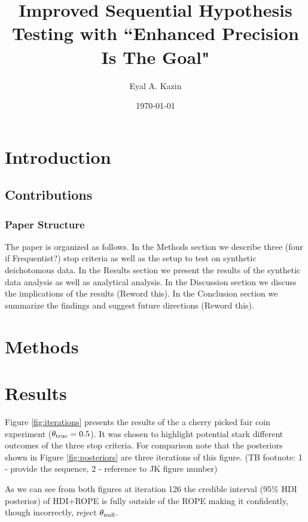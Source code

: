 \documentclass{article}
\title{Improved Sequential Hypothesis Testing with
``Enhanced Precision Is The Goal"}
\date{\today}
\author{Eyal A. Kazin}
\begin{document}
\maketitle



\section{Introduction}


\subsection{Contributions}

\subsubsection{Paper Structure}
The paper is organized as follows.
In the Methods section we describe three (four if Frequentist?)
stop criteria as well as the setup to test on synthetic deichotomous data.
In the Results section we present the results of the synthetic data analysis as well as analytical analysis.
In the Discussion section we discuss the implications of the results (Reword this).
In the Conclusion section we summarize the findings and suggest future directions (Reword this).


\section{Methods}




\section{Results}

Figure \ref{fig:iterations} presents the results of the a cherry picked fair coin
experiment ($\theta_{\rm true}=0.5$). It was chosen to highlight potential stark
different outcomes of the three stop criteria. For comparison note that the posteriors
shown in Figure \ref{fig:posteriors} are three iterations of this figure.
(TB footnote: 1 - provide the sequence, 2 - reference to JK figure number)

As we can see from both figures at iteration 126 the credible interval (95\% HDI posterior) of HDI+ROPE is fully
outside of the ROPE making it confidently, though incorrectly, reject $\theta_{\rm null}$.
\end{document}
